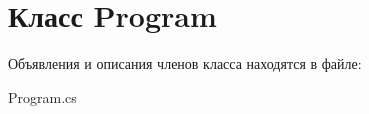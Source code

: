 \hypertarget{class_program}{}\section{Класс Program}
\label{class_program}


Объявления и описания членов класса находятся в файле\+:\begin{DoxyCompactItemize}
\item 
Program.\+cs\end{DoxyCompactItemize}
